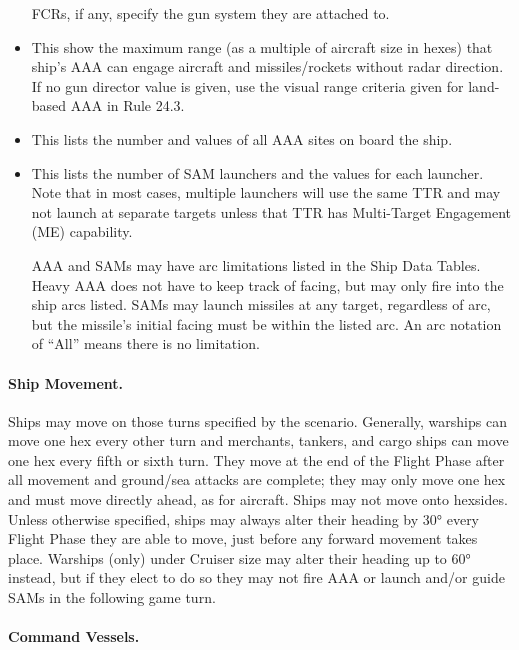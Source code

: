 \begin{itemize}
    FCRs, if any, specify the gun system they are attached to.

    \item {} This show the maximum range (as a multiple of aircraft size in hexes) that ship's AAA can engage aircraft and missiles/rockets without radar direction.  If no gun director value is given, use the visual range criteria given for land-based AAA in Rule 24.3.

    \item {} This lists the number and values of all AAA sites on board the ship. 

    \item {} This lists the number of SAM launchers and the values for each launcher.  Note that in most cases, multiple launchers will use the same TTR and may not launch at separate targets unless that TTR has Multi-Target Engagement (ME) capability.

    AAA and SAMs may have arc limitations listed in the Ship Data Tables. Heavy AAA does not have to keep track of facing, but may only fire into the ship arcs listed.  SAMs may launch missiles at any target, regardless of arc, but the missile's initial facing must be within the listed arc.  An arc notation of “All” means there is no limitation.
\end{itemize}


\paragraph{Ship Movement.} 

Ships may move on those turns specified by the scenario. Generally, warships can move one hex every other turn and merchants, tankers, and cargo ships can move one hex every fifth or sixth turn. They move at the end of the Flight Phase after all movement and ground/sea attacks are complete; they may only move one hex and must move directly ahead, as for aircraft.  Ships may not move onto hexsides.  Unless otherwise specified, ships may always alter their heading by 30° every Flight Phase they are able to move, just before any forward movement takes place.  Warships (only) under Cruiser size may alter their heading up to 60° instead, but if they elect to do so they may not fire AAA or launch and/or guide SAMs in the following game turn.

\paragraph{Command Vessels.}

